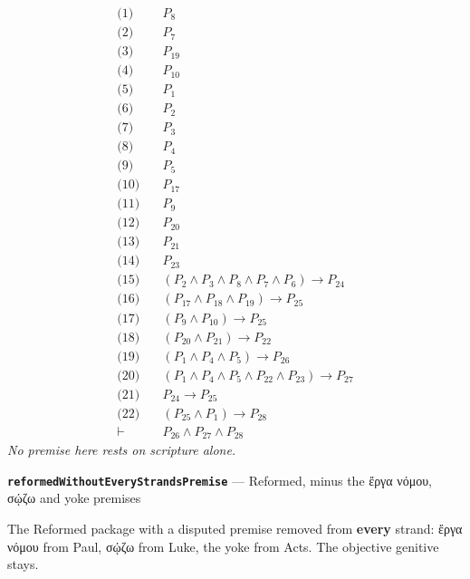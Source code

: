 \documentclass[11pt]{article}
\begin{document}
\begin{align*}
  \text{(1)} \quad & P_{8} \\
  \text{(2)} \quad & P_{7} \\
  \text{(3)} \quad & P_{19} \\
  \text{(4)} \quad & P_{10} \\
  \text{(5)} \quad & P_{1} \\
  \text{(6)} \quad & P_{2} \\
  \text{(7)} \quad & P_{3} \\
  \text{(8)} \quad & P_{4} \\
  \text{(9)} \quad & P_{5} \\
  \text{(10)} \quad & P_{17} \\
  \text{(11)} \quad & P_{9} \\
  \text{(12)} \quad & P_{20} \\
  \text{(13)} \quad & P_{21} \\
  \text{(14)} \quad & P_{23} \\
  \text{(15)} \quad & (P_{2} \land P_{3} \land P_{8} \land P_{7} \land P_{6}) \rightarrow P_{24} \\
  \text{(16)} \quad & (P_{17} \land P_{18} \land P_{19}) \rightarrow P_{25} \\
  \text{(17)} \quad & (P_{9} \land P_{10}) \rightarrow P_{25} \\
  \text{(18)} \quad & (P_{20} \land P_{21}) \rightarrow P_{22} \\
  \text{(19)} \quad & (P_{1} \land P_{4} \land P_{5}) \rightarrow P_{26} \\
  \text{(20)} \quad & (P_{1} \land P_{4} \land P_{5} \land P_{22} \land P_{23}) \rightarrow P_{27} \\
  \text{(21)} \quad & P_{24} \rightarrow P_{25} \\
  \text{(22)} \quad & (P_{25} \land P_{1}) \rightarrow P_{28} \\
  \vdash \quad & P_{26} \land P_{27} \land P_{28}
\end{align*}
\emph{No premise here rests on scripture alone.}
\par\medskip\noindent\textbf{\texttt{reformed\allowbreak{}Without\allowbreak{}Every\allowbreak{}Strands\allowbreak{}Premise}} --- Reformed, minus the ἔργα νόμου, σῴζω and yoke premises\par\nobreak\noindent
The Reformed package with a disputed premise removed from \textbf{every} strand: ἔργα νόμου from Paul, σῴζω from Luke, the yoke from Acts. The objective genitive stays.
\end{document}
